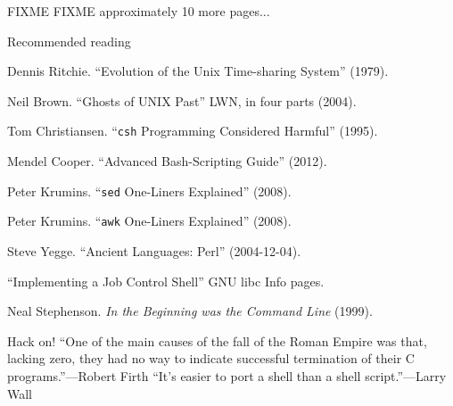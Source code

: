 \documentclass[mathserif,xcolor={dvipsnames,table}]{beamer}
\begin{document}
\begin{frame}{FIXME}
\huge FIXME approximately 10 more pages...
\end{frame}

\begin{frame}{Recommended reading}
\begin{itemize}
\small{
\item Dennis Ritchie. ``Evolution of the Unix Time-sharing System'' (1979).
\item Neil Brown. ``Ghosts of UNIX Past'' LWN, in four parts (2004).
\item Tom Christiansen. ``\texttt{csh} Programming Considered Harmful'' (1995).
\item Mendel Cooper. ``Advanced Bash-Scripting Guide'' (2012).
\item Peter Krumins. ``\texttt{sed} One-Liners Explained'' (2008).
\item Peter Krumins. ``\texttt{awk} One-Liners Explained'' (2008).
\item Steve Yegge. ``Ancient Languages: Perl'' (2004-12-04).
\item ``Implementing a Job Control Shell'' GNU libc Info pages.
\item Neal Stephenson. \textit{In the Beginning was the Command Line} (1999).
}
\end{itemize}
\end{frame}

\begin{frame}{Hack on!}
``One of the main causes of the fall of the Roman Empire was that, lacking zero, they had no way to indicate successful termination of their C programs.''\hfill---Robert Firth
\vfill
``It's easier to port a shell than a shell script.''\hfill---Larry Wall
\end{frame}
\end{document}
